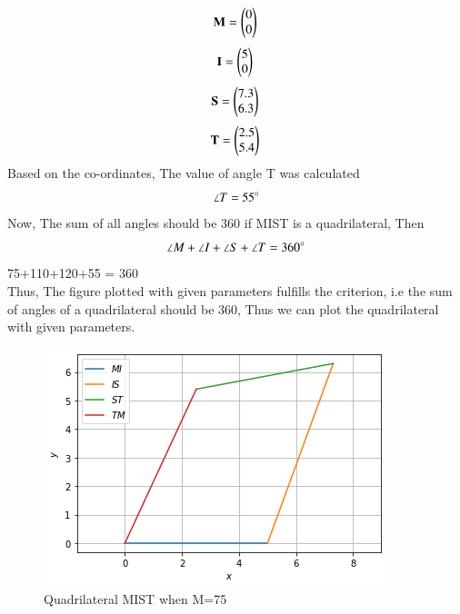 \documentclass[journal,12pt,twocolumn]{IEEEtran}
\begin{document}
$$\mathbf {M} =\begin{pmatrix}0\\0\end{pmatrix}\\$$
$$\mathbf {I} =\begin{pmatrix}5\\0\end{pmatrix}\\$$
$$\mathbf {S} =\begin{pmatrix}7.3\\6.3\end{pmatrix}\\$$
$$\mathbf {T} =\begin{pmatrix}2.5\\5.4\end{pmatrix}\\$$
Based on the co-ordinates, The value of angle T was calculated
$$\angle T = 55\degree$$
Now, The sum of all angles should be 360\degree
if MIST is a quadrilateral,
Then
$$\angle M+\angle I+\angle S+\angle T= 360\degree$$
75+110+120+55 = 360\degree\\
Thus, The figure plotted with given parameters fulfills the criterion, i.e the sum of angles of a quadrilateral should be 360\degree , Thus we can plot the quadrilateral with given parameters.\\

\begin{figure}[assignment 3.png]
\includegraphics[width=\columnwidth]{assignment 3.png}
  \caption{Quadrilateral MIST when \angle M=75}
  \label{fig:Quadrilateral MIST}
\end{figure}
\end{document}
